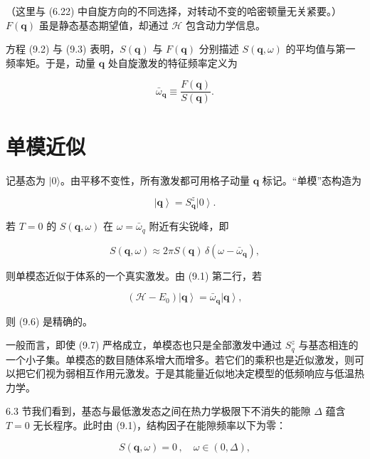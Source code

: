 （这里与 (6.22) 中自旋方向的不同选择，对转动不变的哈密顿量无关紧要。）$F(\mathbf{q})$ 虽是静态基态期望值，却通过 $\mathcal{H}$ 包含动力学信息。

方程 (9.2) 与 (9.3) 表明，$S(\mathbf{q})$ 与 $F(\mathbf{q})$ 分别描述 $S(\mathbf{q},\omega)$ 的平均值与第一频率矩。于是，动量 $\mathbf{q}$ 处自旋激发的特征频率定义为

\begin{equation*}
\bar {\omega} _ {\mathbf {q}} \equiv \frac {F ( \mathbf {q} )}{S ( \mathbf {q} )}.
\tag{9.4}
\end{equation*}

\section{单模近似}

记基态为 $|0\rangle$。由平移不变性，所有激发都可用格子动量 $\mathbf{q}$ 标记。“单模”态构造为

\begin{equation*}
\left| \mathbf {q} \right\rangle = S _ {\mathbf {q}} ^ {z} \left| 0 \right\rangle .
\tag{9.5}
\end{equation*}

若 $T=0$ 的 $S(\mathbf{q},\omega)$ 在 $\omega=\bar{\omega}_{q}$ 附近有尖锐峰，即

\begin{equation*}
S ( \mathbf {q}, \omega ) \approx 2 \pi S ( \mathbf {q} ) \, \delta ( \omega - \bar {\omega} _ {\mathbf {q}} ) ,
\tag{9.6}
\end{equation*}

则单模态近似于体系的一个真实激发。由 (9.1) 第二行，若

\begin{equation*}
( \mathcal {H} - E _ {0} ) \left| \mathbf {q} \right\rangle = \bar {\omega} _ {\mathbf {q}} \left| \mathbf {q} \right\rangle ,
\tag{9.7}
\end{equation*}

则 (9.6) 是精确的。

一般而言，即使 (9.7) 严格成立，单模态也只是全部激发中通过 $S_{q}^{z}$ 与基态相连的一个小子集。单模态的数目随体系增大而增多。若它们的乘积也是近似激发，则可以把它们视为弱相互作用元激发。于是其能量近似地决定模型的低频响应与低温热力学。

6.3 节我们看到，基态与最低激发态之间在热力学极限下不消失的能隙 $\Delta$ 蕴含 $T = 0$ 无长程序。此时由 (9.1)，结构因子在能隙频率以下为零：

\begin{equation*}
S ( \mathbf {q}, \omega ) = 0 \, , \quad \omega \in ( 0, \Delta ) ,
\tag{9.8}
\end{equation*}


